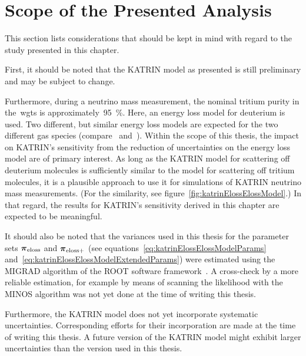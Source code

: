 \section{Scope of the Presented Analysis}
\label{sec:katrinElossValidity}
This section lists considerations that should be kept in mind with regard to the study presented in this chapter.

First, it should be noted that the KATRIN model as presented is still preliminary and may be subject to change.

Furthermore, during a neutrino mass measurement, the nominal tritium purity in the~\gls{wgts} is approximately~\SI{95}{\percent}. Here, an energy loss model for deuterium is used. Two different, but similar energy loss models are expected for the two different gas species (compare~\cite{Abdurashitov2017} and~\cite{Aseev2000}). Within the scope of this thesis, the impact on KATRIN's sensitivity from the reduction of uncertainties on the energy loss model are of primary interest. As long as the KATRIN model for scattering off deuterium molecules is sufficiently similar to the model for scattering off tritium molecules, it is a plausible approach to use it for simulations of KATRIN neutrino mass measurements. (For the similarity, see figure~\ref{fig:katrinElossElossModel}.) In that regard, the results for KATRIN's sensitivity derived in this chapter are expected to be meaningful.

It should also be noted that the variances used in this thesis for the parameter sets $\boldsymbol{\mathbf{\pi}}_\mathrm{eloss}$ and $\boldsymbol{\mathbf{\pi}}_\mathrm{eloss+}$ (see equations~\ref{eq:katrinElossElossModelParams} and~\ref{eq:katrinElossElossModelExtendedParams}) were estimated using the MIGRAD algorithm of the ROOT software framework~\cite{Hannen2019_1}. A cross-check by a more reliable estimation, for example by means of scanning the likelihood with the MINOS algorithm was not yet done at the time of writing this thesis.

Furthermore, the KATRIN model does not yet incorporate systematic uncertainties. Corresponding efforts for their incorporation are made at the time of writing this thesis. A future version of the KATRIN model might exhibit larger uncertainties than the version used in this thesis.



\def\currentRootFolder{chapter/sensitivityStudyWithPreliminaryKatrinElossModel}
\def\currentFigureFolder{\currentRootFolder/fig}

